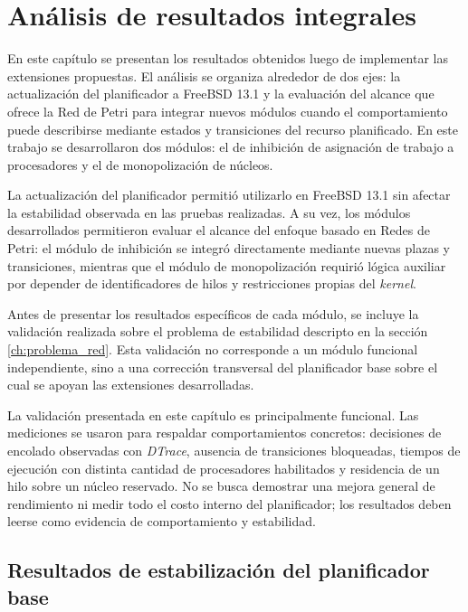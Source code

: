 \chapter{Análisis de resultados integrales}
\label{ch:results}

En este capítulo se presentan los resultados obtenidos luego de implementar las extensiones propuestas. El análisis se organiza alrededor de dos ejes: la actualización del planificador a FreeBSD 13.1 y la evaluación del alcance que ofrece la Red de Petri para integrar nuevos módulos cuando el comportamiento puede describirse mediante estados y transiciones del recurso planificado. En este trabajo se desarrollaron dos módulos: el de inhibición de asignación de trabajo a procesadores y el de monopolización de núcleos.\par

La actualización del planificador permitió utilizarlo en FreeBSD 13.1 sin afectar la estabilidad observada en las pruebas realizadas. A su vez, los módulos desarrollados permitieron evaluar el alcance del enfoque basado en Redes de Petri: el módulo de inhibición se integró directamente mediante nuevas plazas y transiciones, mientras que el módulo de monopolización requirió lógica auxiliar por depender de identificadores de hilos y restricciones propias del \textit{kernel}.\par

Antes de presentar los resultados específicos de cada módulo, se incluye la validación realizada sobre el problema de estabilidad descripto en la sección \ref{ch:problema_red}. Esta validación no corresponde a un módulo funcional independiente, sino a una corrección transversal del planificador base sobre el cual se apoyan las extensiones desarrolladas.\par

La validación presentada en este capítulo es principalmente funcional. Las mediciones se usaron para respaldar comportamientos concretos: decisiones de encolado observadas con \textit{DTrace}, ausencia de transiciones bloqueadas, tiempos de ejecución con distinta cantidad de procesadores habilitados y residencia de un hilo sobre un núcleo reservado. No se busca demostrar una mejora general de rendimiento ni medir todo el costo interno del planificador; los resultados deben leerse como evidencia de comportamiento y estabilidad.\par

\section{Resultados de estabilización del planificador base}

